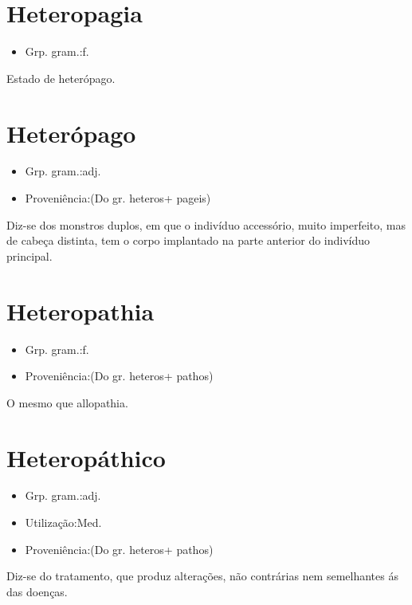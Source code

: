 \documentclass{article}
\begin{document}
\section{Heteropagia}
\begin{itemize}
\item {Grp. gram.:f.}
\end{itemize}
Estado de heterópago.
\section{Heterópago}
\begin{itemize}
\item {Grp. gram.:adj.}
\end{itemize}
\begin{itemize}
\item {Proveniência:(Do gr. \textunderscore heteros\textunderscore  + \textunderscore pageis\textunderscore )}
\end{itemize}
Diz-se dos monstros duplos, em que o indivíduo accessório, muito imperfeito, mas de cabeça distinta, tem o corpo implantado na parte anterior do indivíduo principal.
\section{Heteropathia}
\begin{itemize}
\item {Grp. gram.:f.}
\end{itemize}
\begin{itemize}
\item {Proveniência:(Do gr. \textunderscore heteros\textunderscore  + \textunderscore pathos\textunderscore )}
\end{itemize}
O mesmo que \textunderscore allopathia\textunderscore .
\section{Heteropáthico}
\begin{itemize}
\item {Grp. gram.:adj.}
\end{itemize}
\begin{itemize}
\item {Utilização:Med.}
\end{itemize}
\begin{itemize}
\item {Proveniência:(Do gr. \textunderscore heteros\textunderscore  + \textunderscore pathos\textunderscore )}
\end{itemize}
Diz-se do tratamento, que produz alterações, não contrárias nem semelhantes ás das doenças.
\end{document}
